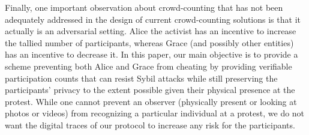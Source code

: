 Finally, one important observation about crowd-counting that has not been adequately addressed in the design of current crowd-counting solutions is that it actually is an adversarial setting. Alice the activist has an incentive to increase the tallied number of participants, whereas Grace (and possibly other entities) has an incentive to decrease it.
In this paper, our main objective is to provide a scheme preventing both Alice 
and Grace from cheating by providing verifiable participation counts that can resist Sybil attacks while still preserving the participants' privacy to the extent possible given their physical presence at the protest. While one cannot
prevent an observer (physically present or looking at photos or videos) from recognizing a particular individual at a protest, we do not want the digital traces of our protocol to increase any risk for the participants.



%






